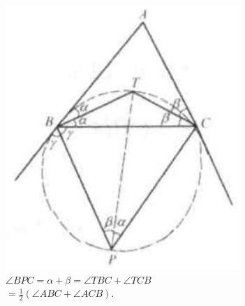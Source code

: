 \documentclass{article}
\begin{document}
\includegraphics[width=\textwidth]{images/195(1).jpg}\\
\(\angle B P C=\alpha+\beta=\angle T B C+\angle T C B\)\\
\(=\frac{1}{2}(\angle A B C+\angle A C B)\).
\end{document}
